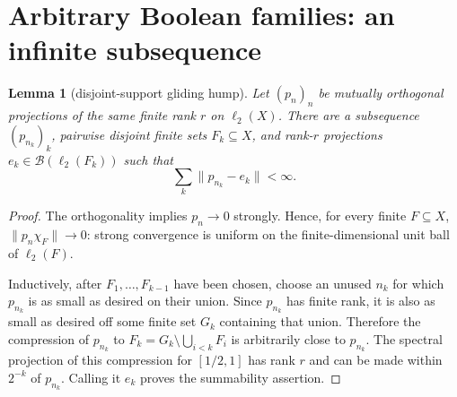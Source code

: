 \documentclass[11pt]{article}
\newtheorem{lemma}[theorem]{Lemma}
\newcommand{\ellTwo}{\ell_2}
\begin{document}
\section{Arbitrary Boolean families: an infinite subsequence}
\begin{lemma}[disjoint-support gliding hump]\label{lem:glide}
Let $(p_n)_n$ be mutually orthogonal projections of the same finite rank
$r$ on $\ellTwo(X)$.  There are a subsequence $(p_{n_k})_k$, pairwise
disjoint finite sets $F_k\subseteq X$, and rank-$r$ projections
$e_k\in\mathcal B(\ellTwo(F_k))$ such that
\[
 \sum_k\|p_{n_k}-e_k\|<\infty.
\]
\end{lemma}
\begin{proof}
The orthogonality implies $p_n\to0$ strongly.  Hence, for every finite
$F\subseteq X$, $\|p_n\chi_F\|\to0$: strong convergence is uniform on the
finite-dimensional unit ball of $\ellTwo(F)$.

Inductively, after $F_1,\ldots,F_{k-1}$ have been chosen, choose an unused
$n_k$ for which $p_{n_k}$ is as small as desired on their union.  Since
$p_{n_k}$ has finite rank, it is also as small as desired off some finite
set $G_k$ containing that union.  Therefore the compression of $p_{n_k}$
to $F_k=G_k\setminus\bigcup_{i<k}F_i$ is arbitrarily close to $p_{n_k}$.
The spectral projection of this compression for $[1/2,1]$ has rank $r$ and
can be made within $2^{-k}$ of $p_{n_k}$.  Calling it $e_k$ proves the
summability assertion.
\end{proof}
\end{document}
